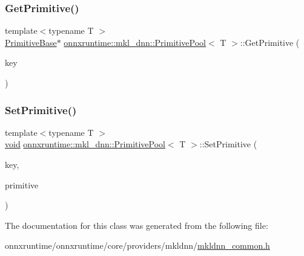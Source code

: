 \subsubsection{\texorpdfstring{Get\+Primitive()}{GetPrimitive()}}
{\footnotesize\ttfamily template$<$typename T $>$ \\
\mbox{\hyperlink{classonnxruntime_1_1mkl__dnn_1_1PrimitiveBase}{Primitive\+Base}}$\ast$ \mbox{\hyperlink{classonnxruntime_1_1mkl__dnn_1_1PrimitivePool}{onnxruntime\+::mkl\+\_\+dnn\+::\+Primitive\+Pool}}$<$ T $>$\+::Get\+Primitive (\begin{DoxyParamCaption}\item[{const std\+::string \&}]{key }\end{DoxyParamCaption})\hspace{0.3cm}{\ttfamily [inline]}}

\mbox{\label{classonnxruntime_1_1mkl__dnn_1_1PrimitivePool_a5eb4120ee1aba640eeba05b34603786e}} 
\subsubsection{\texorpdfstring{Set\+Primitive()}{SetPrimitive()}}
{\footnotesize\ttfamily template$<$typename T $>$ \\
\mbox{\hyperlink{mlasi_8h_a88f941d423cb2a819b70a1358982b1a6}{void}} \mbox{\hyperlink{classonnxruntime_1_1mkl__dnn_1_1PrimitivePool}{onnxruntime\+::mkl\+\_\+dnn\+::\+Primitive\+Pool}}$<$ T $>$\+::Set\+Primitive (\begin{DoxyParamCaption}\item[{const std\+::string \&}]{key,  }\item[{std\+::unique\+\_\+ptr$<$ \mbox{\hyperlink{classonnxruntime_1_1mkl__dnn_1_1PrimitiveBase}{Primitive\+Base}} $>$}]{primitive }\end{DoxyParamCaption})\hspace{0.3cm}{\ttfamily [inline]}}



The documentation for this class was generated from the following file\+:\begin{DoxyCompactItemize}
\item 
onnxruntime/onnxruntime/core/providers/mkldnn/\mbox{\hyperlink{mkldnn__common_8h}{mkldnn\+\_\+common.\+h}}\end{DoxyCompactItemize}

